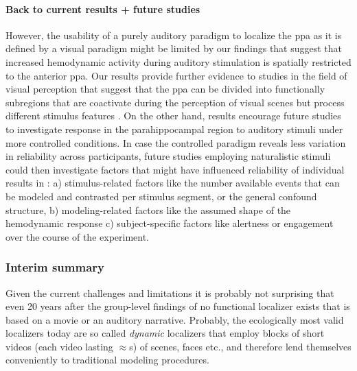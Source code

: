 \paragraph{Back to current results + future studies}


%
However, the usability of a purely auditory paradigm to localize the \ac{ppa} as
it is defined by a visual paradigm might be limited by our findings that suggest
that increased hemodynamic activity during auditory stimulation is spatially
restricted to the anterior \ac{ppa}.
%
Our results provide further evidence to studies in the field of
visual perception that suggest that the \ac{ppa} can be divided into
functionally subregions that are coactivate during the perception of visual
scenes but process different stimulus features
\citep{aminoff2007parahippocampal, baldassano2013differential}.
%
On the other hand, results encourage future studies to investigate response in
the parahippocampal region to auditory stimuli under more controlled conditions.
%
In case the controlled paradigm reveals less variation in reliability across
participants, future studies employing naturalistic stimuli could then
investigate factors that might have influenced reliability of individual results
in \citet{haeusler2022processing}:
%
a) stimulus-related factors like the number available events that can be modeled
and contrasted per stimulus segment, or the general confound structure,
%
b) modeling-related factors like the assumed shape of the hemodynamic response
%
c) subject-specific factors like alertness or engagement over the course of the
experiment.


\subsubsection{Interim summary}


%
Given the current challenges and limitations it is probably not surprising that
even 20 years after the group-level findings of \citet{bartels2004mapping} no
functional localizer exists that is based on a movie or an auditory narrative.
%
Probably, the ecologically most valid localizers today are so called
\textit{dynamic} localizers \citep[e.g.,][]{pitcher2011differential,
fox2009defining} that employ blocks of short videos (each video lasting
$\approx$\unit[2-3]{s}) of scenes, faces etc., and therefore lend themselves
conveniently to traditional modeling procedures.

